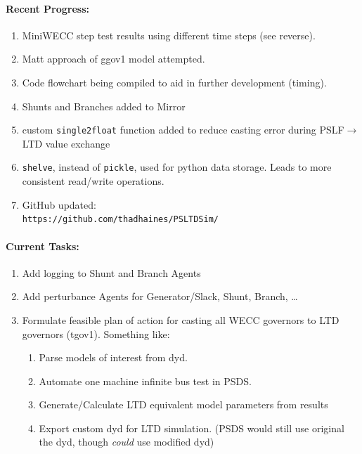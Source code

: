 \documentclass[12pt]{article}
\begin{document}
\begin{multicols}{2}

	\paragraph{Recent Progress:}
	\begin{enumerate}
		\item MiniWECC step test results using different time steps (see reverse).
		
		\item Matt approach of ggov1 model attempted.

		\item Code flowchart being compiled to aid in further development (timing).

		\item Shunts and Branches added to Mirror
		\item custom \verb|single2float| function added to reduce casting error during PSLF$\longrightarrow$LTD value exchange

		\item \verb|shelve|, instead of \verb|pickle|, used for python data storage. Leads to more consistent read/write operations.


		\item GitHub updated:\\
		\verb|https://github.com/thadhaines/PSLTDSim/|
		
	\end{enumerate}
\paragraph{Current Tasks:}
	\begin{enumerate}
		\item Add logging to Shunt and Branch Agents
		\item Add perturbance Agents for Generator/Slack, Shunt, Branch, \ldots
		\item Formulate feasible plan of action for casting all WECC governors to LTD governors (tgov1). Something like:
		\begin{enumerate}
		\item Parse models of interest from dyd.
		\item Automate one machine infinite bus test in PSDS.
		\item Generate/Calculate LTD equivalent model parameters from results
		\item Export custom dyd for LTD simulation. (PSDS would still use original the dyd, though \emph{could} use modified dyd)
		\end{enumerate}
		

\end{enumerate}
\end{multicols}
\end{document}
